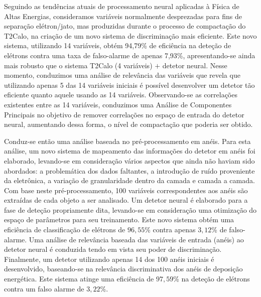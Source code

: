 Seguindo as tendências atuais de processamento neural aplicadas à Física de
Altas Energias, consideramos variáveis normalmente desprezadas para fins de
separação elétron/jato, mas produzidas durante o processo de compactação do
T2Calo, na criação de um novo sistema de discriminação mais eficiente. Este
novo sistema, utilizando 14 variáveis, obtém 94,79\% de eficiência na deteção
de elétrons contra uma taxa de falso-alarme de apenas 7,93\%, apresentando-se
ainda mais robusto que o sistema T2Calo (4 variáveis) $+$ detetor
neural. Nesse momento, conduzimos uma análise de relevância das variáveis que
revela que utilizando apenas 5 das 14 variáveis iniciais é possível
desenvolver um detetor tão eficiente quanto aquele usando as 14 variáveis.
Observando-se as correlações existentes entre as 14 variáveis, conduzimos uma
Análise de Componentes Principais no objetivo de remover correlações no espaço
de entrada do detetor neural, aumentando dessa forma, o nível de compactação
que poderia ser obtido.

Conduz-se então uma análise baseada no pré-processamento em anéis. Para esta
análise, um novo sistema de mapeamento das informações do detetor em anéis foi
elaborado, levando-se em consideração vários aspectos que ainda não haviam
sido abordados: a problemática dos dados faltantes, a introdução de ruído
proveniente da eletrônica, a variação de granularidade dentro da camada e
camada a camada. Com base neste pré-processamento, 100 variáveis
correspondentes aos anéis são extraídas de cada objeto a ser analisado. Um
detetor neural é elaborado para a fase de deteção propriamente dita,
levando-se em consideração uma otimização do espaço de parâmetros para seu
treinamento. Este novo sistema obtém uma eficiência de classificação de
elétrons de $96,55$\% contra apenas $3,12$\% de falso-alarme. Uma análise de
relevância baseada das variáveis de entrada (anéis) ao detetor neural é
conduzida tendo em vista seu poder de discriminação. Finalmente, um detetor
utilizando apenas 14 dos 100 anéis iniciais é desenvolvido, baseando-se na
relevância discriminativa dos anéis de deposição energética. Este sistema
atinge uma eficiência de $97,59$\% na deteção de elétrons contra um falso
alarme de $3,22$\%.

